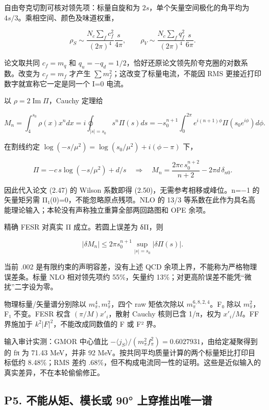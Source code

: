 \documentclass[
  11pt,
  a4paper,
]{article}
\begin{document}
自由夸克切割可核对领先项：标量自旋和为
\(2s\)，单个矢量空间极化的角平均为 \(4s/3\)。乘相空间、颜色及味道权重，

\[
\rho_S\sim\frac{N_c\sum_f c_f^2}{(2\pi)^4}\frac{s}{4\pi},\qquad
\rho_V\sim\frac{N_c\sum_f q_f^2}{(2\pi)^4}\frac{s}{6\pi}.
\]

论文取共同 \(c_f=m_q\) 和
\(q_u=-q_d=1/2\)，恰好还原论文领先阶夸克圈的对数系数。改变为 \(c_f=m_f\)
才产生 \(\sum m_f^2\)；这改变了标量电流，不能因 RMS
更接近打印数字就宣称它一定是同一个 I=0 电流。

以 \(\rho=2\operatorname{Im}\Pi\)，Cauchy 定理给

\[
M_n=\int_4^{s_0}\rho(x)x^n dx
=i\oint_{|s|=s_0}s^n\Pi(s)ds
=-s_0^{n+1}\int_0^{2\pi}e^{i(n+1)\phi}\Pi(s_0e^{i\phi})d\phi.
\]

在割线约定 \(\log(-s/\mu^2)=\log(s_0/\mu^2)+i(\phi-\pi)\) 下，

\[
\Pi=-c\,s\log(-s/\mu^2)+d/s
\quad\Longrightarrow\quad
M_n=\frac{2\pi c\,s_0^{n+2}}{n+2}-2\pi d\,\delta_{n0}.
\]

因此代入论文 (2.47) 的 Wilson 系数即得 (2.50)，无需参考相移或峰位。n=−1
的矢量矩另需 Π₁(0)=0，不能忽略原点残项。NLO 的 13/3
等系数在此作为具名高能理论输入；本轮没有声称独立重算全部两回路图和 OPE
余项。

精确 FESR 对真实 Π 成立。若圆上误差为 δΠ，则

\[
|\delta M_n|\le2\pi s_0^{n+1}\sup_{|s|=s_0}|\delta\Pi(s)|.
\]

当前 .002 是有限约束的声明容差，没有上述 QCD
余项上界，不能称为严格物理误差条。标量 NLO 相对领先项约 55\%，矢量约
13\%；对更高阶误差不能凭``微扰''二字设为零。

物理标量/矢量谱分别除以 \(m_\pi^4,m_\pi^2\)，四个 raw 矩依次除以
\(m_\pi^{6,8,2,4}\)。F₀ 除以 \(m_\pi^2\)，F₁ 不变。FESR 权含
\((\pi/M)x'_i\)，散射 Cauchy 核则已含 1/π，权为 \(x'_i/M\)。FF 界施加于
\(k^2|F|^2\)，不能改成同数值的 \textbar F\textbar{} 或
\textbar F\textbar² 界。

输入审计实测：GMOR 中心值比
\(-\langle j_S\rangle/(m_\pi^2f_\pi^2)=0.6027931\)，由给定凝聚得到的 fπ
为 71.43 MeV，并非 92 MeV。按共同平均质量计算的两个标量矩比打印目标低约
8.48\%；RMS 差约
.68\%，但不构成电流同一性的证明。这些是近似输入的真实差异，不在本轮偷偷修正。

\subsection{P5. 不能从矩、模长或 90°
上穿推出唯一谱}\label{p5.-ux4e0dux80fdux4eceux77e9ux6a21ux957fux6216-90-ux4e0aux7a7fux63a8ux51faux552fux4e00ux8c31}
\end{document}
